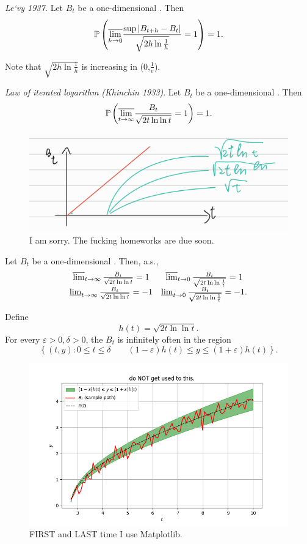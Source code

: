 \documentclass[12pt]{report}
\begin{document}
\begin{theorem}
	\emph{Le`vy 1937.} Let $B_{t}$ be a one-dimensional \bwm{}. Then
	\begin{equation*}
		\mathbb{P}\left(\overline{\lim_{h\to0}}\frac{\sup|B_{t+h}-B_{t}|}{\sqrt{2h\ln \frac{1}{h}}}=1\right)=1.
	\end{equation*}
\end{theorem}
Note that $\sqrt{2h\ln\frac{1}{h}}$ is increasing in (0,$\frac{1}{e}$).
\begin{theorem}
	\emph{Law of iterated logarithm (Khinchin 1933)}. Let $B_{t}$ be a one-dimensional \bwm. Then
	\begin{equation*}
		\mathbb{P}\left(\overline{\lim_{t\to\infty}}\frac{B_{t}}{\sqrt{2t\ln\ln t}}=1\right)=1.
	\end{equation*}
\end{theorem}
\begin{figure}[H]
	\centering
	\includegraphics[width=0.5\linewidth]{img/screenshot044}
	\caption{I am sorry. The fucking homeworks are due soon.}
	\label{fig:screenshot044}
\end{figure}
\begin{corollary}
	Let $B_{t}$ be a one-dimensional \bwm. Then, a.s.,
	\begin{equation*}
		\begin{array}{cc}
			\varlimsup_{t\to\infty}\frac{B_{t}}{\sqrt{2t\ln\ln t}}=1&\varlimsup_{t\to0}\frac{B_{t}}{\sqrt{2t\ln\ln\frac{1}{t}}}=1\\
			\varliminf_{t\to\infty}\frac{B_{t}}{\sqrt{2t\ln\ln t}}=-1&\varliminf_{t\to0}\frac{B_{t}}{\sqrt{2t\ln\ln\frac{1}{t}}}=-1.
		\end{array}
	\end{equation*}
\end{corollary}
Define 
\begin{equation*}
	h(t)=\sqrt{2t\ln\ln t}.
\end{equation*}
For every $\varepsilon>0,\delta>0$, the \bwm{} $B_{t}$ is infinitely often in the region
\begin{equation*}
	\left\{(t,y):0\leq t\leq\delta\qquad(1-\varepsilon)h(t)\leq y\leq(1+\varepsilon)h(t)\right\}.
\end{equation*}
\begin{figure}[h]
	\centering
	\includegraphics[width=0.6\linewidth]{img/screenshot045}
	\caption{FIRST and LAST time I use Matplotlib.}
	\label{fig:screenshot045}
\end{figure}
\end{document}

